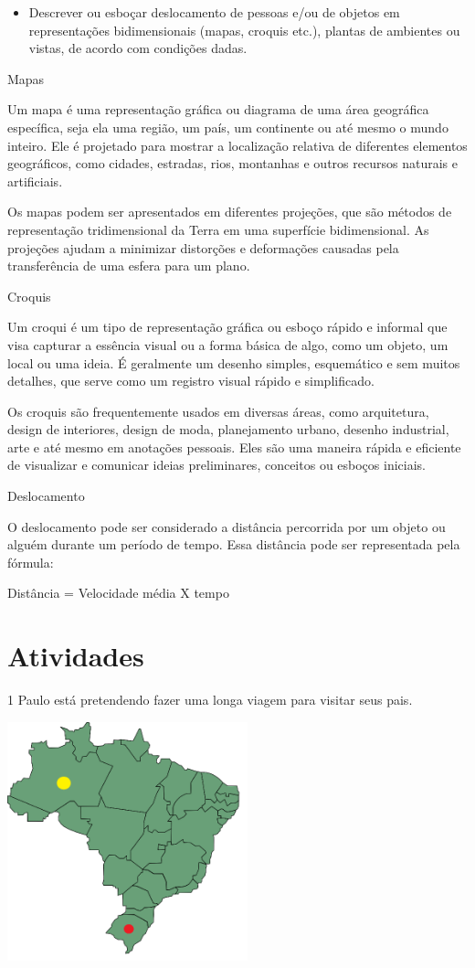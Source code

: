 {\begin{itemize}
\tightlist
\item
  Descrever ou esboçar deslocamento de pessoas e/ou de objetos em
  representações bidimensionais (mapas, croquis etc.), plantas de
  ambientes ou vistas, de acordo com condições dadas.
\end{itemize}

Mapas

Um mapa é uma representação gráfica ou diagrama de uma área geográfica
específica, seja ela uma região, um país, um continente ou até mesmo o
mundo inteiro. Ele é projetado para mostrar a localização relativa de
diferentes elementos geográficos, como cidades, estradas, rios,
montanhas e outros recursos naturais e artificiais.

Os mapas podem ser apresentados em diferentes projeções, que são métodos
de representação tridimensional da Terra em uma superfície
bidimensional. As projeções ajudam a minimizar distorções e deformações
causadas pela transferência de uma esfera para um plano.

Croquis

Um croqui é um tipo de representação gráfica ou esboço rápido e informal
que visa capturar a essência visual ou a forma básica de algo, como um
objeto, um local ou uma ideia. É geralmente um desenho simples,
esquemático e sem muitos detalhes, que serve como um registro visual
rápido e simplificado.

Os croquis são frequentemente usados em diversas áreas, como
arquitetura, design de interiores, design de moda, planejamento urbano,
desenho industrial, arte e até mesmo em anotações pessoais. Eles são uma
maneira rápida e eficiente de visualizar e comunicar ideias
preliminares, conceitos ou esboços iniciais.

Deslocamento

O deslocamento pode ser considerado a distância percorrida por um objeto
ou alguém durante um período de tempo. Essa distância pode ser
representada pela fórmula:

Distância = Velocidade média X tempo

\section{Atividades}

\num{1} Paulo está pretendendo fazer uma longa viagem para visitar seus pais.

\includegraphics[width=2.73952in,height=2.725in]{./imgSAEB_8_MAT/media/image36.png}

}
